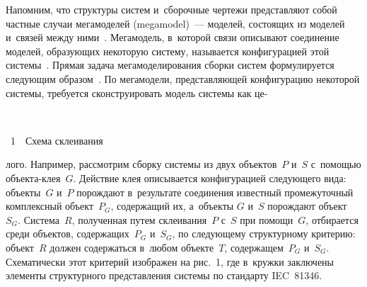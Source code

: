 \begin{multicols}{2}
   Напомним, что структуры сис\-тем и~сборочные чертежи представляют собой 
частные случаи мегамоделей (megamodel)~--- моделей, состоящих из моделей 
и~связей между ними~\cite{8-kov}. Мегамодель, в~которой связи описывают соединение 
моделей,\linebreak
 образующих некоторую сис\-те\-му, называется конфигурацией этой 
сис\-те\-мы~\cite{6-kov}. Прямая задача мегамоделирования сборки сис\-тем формулируется\linebreak 
следующим образом~\cite{4-kov}. По мегамодели, пред\-став\-ля\-ющей конфигурацию 
некоторой сис\-те\-мы, требуется сконструировать модель сис\-те\-мы как це-\linebreak\vspace*{-12pt}

 { \begin{center}  %
 \vspace*{-1pt}
  \mbox{%
 \epsfxsize=61.131mm 
 }


\vspace*{6pt}


\noindent
{{\figurename~1}\ \ \small{Схема склеивания}}
\end{center}
}


\vspace*{9pt}

\addtocounter{figure}{1}



\noindent
лого. 
Например, рас\-смот\-рим сборку сис\-те\-мы из двух объектов~$P$ и~$S$  
с~по\-мощью объ\-ек\-та-клея~$G$. Действие клея описывается конфигурацией 
следующего вида: объекты~$G$ и~$P$ по\-рож\-да\-ют в~результате соединения 
известный промежуточный комплексный объект~$P_G$, содержащий их, 
а~объекты $G$ и~$S$ порождают объект~$S_G$. Система~$R$, полученная 
путем склеивания~$P$ с~$S$ при помощи~$G$, отбирается среди объектов, 
содержащих~$P_G$ и~$S_G$, по сле\-ду\-юще\-му структурному критерию: 
объект~$R$ должен содержаться в~любом объекте~$T$, содержащем~$P_G$ 
и~$S_G$. Схематически этот критерий изображен на рис.~1, где в~кружки 
заключены элементы структурного представления сис\-те\-мы по стандарту 
IEC~81346.
    
\begin{figure*} %
\vspace*{1pt}
 \begin{center}
 \mbox{%
 \epsfxsize=115.833mm 
 }
 \end{center}
\vspace*{-9pt}
\end{figure*}


\end{multicols}
